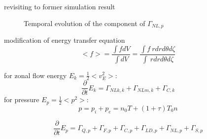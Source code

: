 \documentclass{beamer}
\begin{document}
\begin{frame}{revisiting to former simulation result}
	\begin{figure}[H]
		\centering
		\caption{Temporal evolution of the component of $\Gamma_{NL,p}$}
	\end{figure}
\end{frame}


\begin{frame}{modification of energy transfer equation}
\begin{equation}
<f>=\frac{\int{f}dV}{\int{dV}}
=\frac{\int{f}\ rdrd\theta{d\zeta}}{\int\ rdrd\theta{d\zeta}}
\end{equation}

for zonal flow energy $E_k=\frac{1}{2}<v_E^2>$:
\begin{equation}
\frac{\partial}{\partial{t}}E_k=\Gamma_{NLk,k}+\Gamma_{NLm,k}+\Gamma_{C,k}
\end{equation}
for pressure $E_p=\frac{1}{2}<p^2>$:
\begin{equation}
p=p_i+p_e=n_0T+(1+\tau)T_0{n}
\end{equation}

\begin{equation}
\frac{\partial}{\partial{t}}E_p=\Gamma_{Q,p}+\Gamma_{F,p}+\Gamma_{C,p}+\Gamma_{LD,p}+\Gamma_{NL,p}+\Gamma_{S,p}
\end{equation}
\end{frame}
\end{document}
